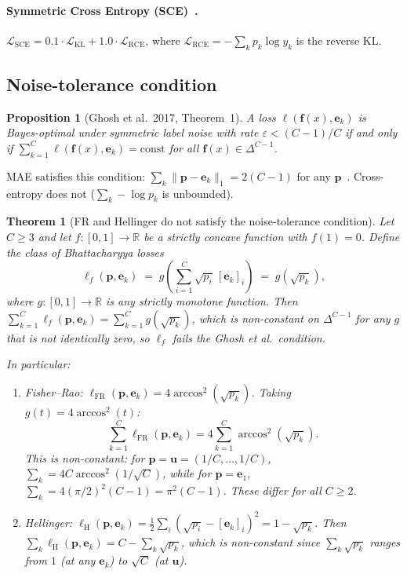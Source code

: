 \documentclass[11pt]{article}
\newtheorem{theorem}{Theorem}
\newtheorem{proposition}{Proposition}
\begin{document}
\paragraph{Symmetric Cross Entropy (SCE)~\citep{wang2019symmetric}.}
$\mathcal{L}_\mathrm{SCE} = 0.1\cdot\mathcal{L}_\mathrm{KL} +
1.0\cdot\mathcal{L}_\mathrm{RCE}$, where $\mathcal{L}_\mathrm{RCE} = -\sum_k
p_k \log y_k$ is the reverse KL.

\subsection{Noise-tolerance condition}

\begin{proposition}[Ghosh et al.\ 2017, Theorem~1]
  \label{prop:ghosh}
  A loss $\ell(\mathbf{f}(x), \mathbf{e}_k)$ is Bayes-optimal under symmetric
  label noise with rate $\varepsilon < (C-1)/C$ if and only if
  $\sum_{k=1}^C \ell(\mathbf{f}(x), \mathbf{e}_k) = \mathrm{const}$
  for all $\mathbf{f}(x) \in \Delta^{C-1}$.
\end{proposition}

MAE satisfies this condition: $\sum_k \|\mathbf{p} - \mathbf{e}_k\|_1 = 2(C-1)$
for any $\mathbf{p}$~\citep{ghosh2017robust}.
Cross-entropy does not ($\sum_k -\log p_k$ is unbounded).

\begin{theorem}[FR and Hellinger do not satisfy the noise-tolerance condition]
\label{thm:fr_no_ntc}
Let $C \geq 3$ and let $f : [0,1] \to \mathbb{R}$ be a strictly concave
function with $f(1) = 0$.
Define the class of \emph{Bhattacharyya losses}
\[
  \ell_f(\mathbf{p},\mathbf{e}_k) \;=\; g\!\left(\sum_{i=1}^C \sqrt{p_i}\,[\mathbf{e}_k]_i\right)
  \;=\; g(\sqrt{p_k}),
\]
where $g : [0,1]\to\mathbb{R}$ is any strictly monotone function.
Then $\sum_{k=1}^C \ell_f(\mathbf{p},\mathbf{e}_k) = \sum_{k=1}^C g(\sqrt{p_k})$,
which is non-constant on $\Delta^{C-1}$ for any $g$ that is not
identically zero, so $\ell_f$ fails the Ghosh et al.\ condition.

In particular:
\begin{enumerate}[label=(\roman*)]
  \item \emph{Fisher--Rao:} $\ell_\mathrm{FR}(\mathbf{p},\mathbf{e}_k) = 4\arccos^2(\sqrt{p_k})$.
    Taking $g(t) = 4\arccos^2(t)$:
    \[
      \sum_{k=1}^C \ell_\mathrm{FR}(\mathbf{p},\mathbf{e}_k) = 4\sum_{k=1}^C \arccos^2(\sqrt{p_k}).
    \]
    This is non-constant: for $\mathbf{p} = \mathbf{u} = (1/C,\ldots,1/C)$,
    $\sum_k = 4C\arccos^2(1/\sqrt{C})$, while for $\mathbf{p} = \mathbf{e}_1$,
    $\sum_k = 4(\pi/2)^2(C-1) = \pi^2(C-1)$.
    These differ for all $C \geq 2$.

  \item \emph{Hellinger:} $\ell_\mathrm{H}(\mathbf{p},\mathbf{e}_k) =
    \tfrac{1}{2}\sum_i(\sqrt{p_i}-[\mathbf{e}_k]_i)^2 = 1 - \sqrt{p_k}$.
    Then $\sum_k \ell_\mathrm{H}(\mathbf{p},\mathbf{e}_k) = C - \sum_k\sqrt{p_k}$,
    which is non-constant since $\sum_k\sqrt{p_k}$ ranges from $1$ (at any $\mathbf{e}_k$)
    to $\sqrt{C}$ (at $\mathbf{u}$).
\end{enumerate}
\end{theorem}
\end{document}
